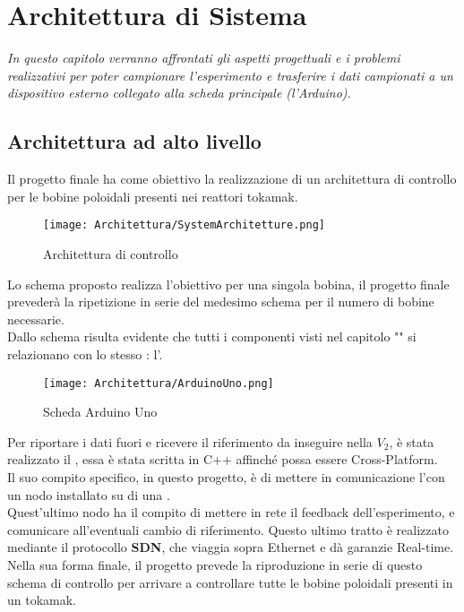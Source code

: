 \chapter{Architettura di Sistema}\label{cap:Architettura}

\begin{minipage}{12cm}\textit{
		In questo capitolo verranno affrontati gli aspetti progettuali e i problemi realizzativi per poter campionare l'esperimento e trasferire i dati campionati a un dispositivo esterno collegato alla scheda principale (l'Arduino).
	}
\end{minipage}

\vspace*{1cm}

\section{Architettura ad alto livello}\label{sec:architettura}
Il progetto finale ha come obiettivo la realizzazione di un architettura di controllo per le bobine poloidali presenti nei reattori tokamak.

\begin{figure}[h] \label{fig:archietturaControllo}
	\centering
	\texttt{[image: Architettura/SystemArchitetture.png]}
	\caption[Schema finale dell'archiettettura di controllo]{Architettura di controllo}
\end{figure}

\noindent
Lo schema proposto realizza l'obiettivo per una singola bobina, il progetto finale prevederà la ripetizione in serie del medesimo schema per il numero di bobine necessarie.\\
Dallo schema risulta evidente che tutti i componenti visti nel capitolo "" si relazionano con lo stesso \microControllore: l'\ArduinoUno.
\begin{figure}[h]
	\centering
	\texttt{[image: Architettura/ArduinoUno.png]}
	\caption[Scheda Arduino Uno]{Scheda Arduino Uno}
\end{figure}

\noindent
Per riportare i dati fuori e ricevere il riferimento da inseguire nella $V_2$, è stata realizzato il , essa è stata scritta in C++ affinché possa essere Cross-Platform.\\
Il suo compito specifico, in questo progetto, è di mettere in comunicazione l'\ArduinoUno con un nodo \MARTe installato su di una \Rasp.\\
Quest'ultimo nodo ha il compito di mettere in rete il feedback dell'esperimento, e comunicare all'\ArduinoUno eventuali cambio di riferimento. Questo ultimo tratto è realizzato mediante il protocollo \textbf{SDN}, che viaggia sopra Ethernet e dà garanzie Real-time.\\
Nella sua forma finale, il progetto prevede la riproduzione in serie di questo schema di controllo per arrivare a controllare tutte le bobine poloidali presenti in un tokamak.

